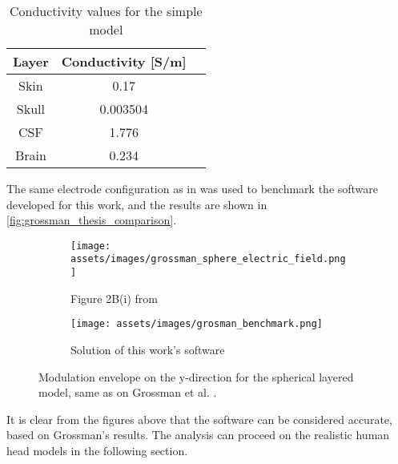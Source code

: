\begin{table}[!ht]
\centering
\caption{Conductivity values for the simple model \cite{ITstissue}}
\label{tab:grossman_conductivity_vals}
\begin{tabular}{|c|c|c|}
    \hline
    \rowcolor[HTML]{C0C0C0} 
    {\color[HTML]{000000} \textbf{Layer}} & {\color[HTML]{000000} \textbf{Conductivity {[}S/m{]}}} \\ \hline
    Skin & 0.17 \\ \hline
    Skull & 0.003504 \\ \hline
    CSF & 1.776 \\ \hline
    Brain & 0.234 \\ \hline
\end{tabular}
\end{table}

The same electrode configuration as in  was used to benchmark the software developed for this work, and the results are shown in \autoref{fig:grossman_thesis_comparison}.
\begin{figure}[H]
    \centering
    \begin{subfigure}[b]{0.49\textwidth}
        \centering
        \texttt{[image: assets/images/grossman\_sphere\_electric\_field.png]}
        \caption{Figure 2B(i) from }
        \label{fig:grossman_envelope}
    \end{subfigure}
    \begin{subfigure}[b]{0.49\textwidth}
        \centering
        \texttt{[image: assets/images/grosman\_benchmark.png]}
        \caption{Solution of this work's software}
        \label{fig:envelope_at_y_benchmark}
    \end{subfigure}
    \caption[Modulation envelope on the y-direction for the spherical layered model]{Modulation envelope on the y-direction for the spherical layered model, same as on Grossman et al. \cite[Figure 2B]{Grossman2017}.}
    \label{fig:grossman_thesis_comparison}
\end{figure}

It is clear from the figures above that the software can be considered accurate, based on Grossman's results. The analysis can proceed on the realistic human head models in the following section.

